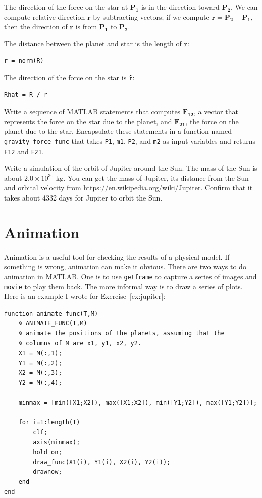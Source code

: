 \documentclass[
]{book}
\renewcommand{\vec}[1]{\bm{\mathbf{#1}}}
\newcommand{\uveci}{{\bm{\hat{\textnormal{\bfseries\i}}}}}
\newcommand{\uvecj}{{\bm{\hat{\textnormal{\bfseries\j}}}}}
\newcommand{\uvec}[1]{%
    \ifthenelse{\equal{#1}{i}}%
        {\uveci}{%
    \ifthenelse{\equal{#1}{j}}%
        {\uvecj}{%
    {\bm{\hat{\mathbf{#1}}}}%
}}}
\begin{document}
The direction of the force on the star at $\vec{P_1}$ is in the
direction toward $\vec{P_2}$.  We can compute relative direction $\vec{r}$ by
subtracting vectors; if we compute $\vec{r} = \vec{P_2} - \vec{P_1}$, then
the direction of $\vec{r}$ is from $\vec{P_1}$ to $\vec{P_2}$.

The distance between the planet and star is the length of $\vec{r}$:

\begin{verbatim}
r = norm(R)
\end{verbatim}

The direction of the force on the star is $\uvec{r}$:

\begin{verbatim}
Rhat = R / r
\end{verbatim}

\begin{ex}
Write a sequence of MATLAB statements that computes $\vec{F_{12}}$, a vector
that represents the force on the star due to the planet, and
$\vec{F_{21}}$, the force on the planet due to the star. Encapsulate
these statements in a function named {\tt gravity\_force\_func} that
takes {\tt P1}, {\tt m1}, {\tt P2}, and {\tt m2} as input variables
and returns {\tt F12} and {\tt F21}.
\end{ex}

\begin{ex}
\label{ex:jupiter}
Write a simulation of the orbit of Jupiter around the Sun.  The mass
of the Sun is about $2.0 \times 10^{30}$ kg.  You can get the mass of
Jupiter, its distance from the Sun and orbital velocity from
\url{https://en.wikipedia.org/wiki/Jupiter}.  Confirm that it takes
about 4332 days for Jupiter to orbit the Sun.
\end{ex}

\section{Animation}

Animation is a useful tool for checking the results of a physical
model.  If something is wrong, animation can make it obvious.
There are two ways to do animation in MATLAB.  One is to use
{\tt getframe} to capture a series of images and {\tt movie} to
play them back.
The more informal way is to draw a series of plots.
Here is an example I wrote for Exercise~\ref{ex:jupiter}:

\begin{verbatim}
function animate_func(T,M)
    % ANIMATE_FUNC(T,M)
    % animate the positions of the planets, assuming that the
    % columns of M are x1, y1, x2, y2.
    X1 = M(:,1);
    Y1 = M(:,2);
    X2 = M(:,3);
    Y2 = M(:,4);

    minmax = [min([X1;X2]), max([X1;X2]), min([Y1;Y2]), max([Y1;Y2])];

    for i=1:length(T)
        clf;
        axis(minmax);
        hold on;
        draw_func(X1(i), Y1(i), X2(i), Y2(i));
        drawnow;
    end
end
\end{verbatim}
\end{document}
